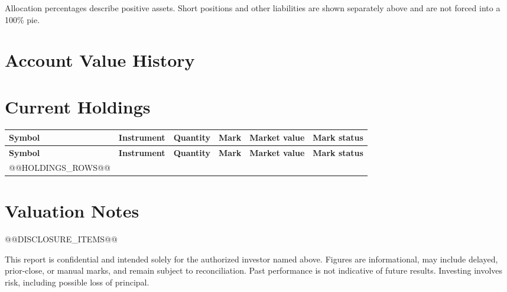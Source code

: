 \documentclass[a4paper,10pt]{article}
\begin{document}
{\footnotesize\color{QSFSlate}
Allocation percentages describe positive assets. Short positions and other liabilities are shown
separately above and are not forced into a 100\% pie.}

\section*{Account Value History}
\begin{center}
\end{center}

\newpage
\section*{Current Holdings}
\small
\begin{longtable}{@{}p{1.7cm}p{3.4cm}r r r p{1.8cm}@{}}
  \toprule
  \textbf{Symbol} & \textbf{Instrument} & \textbf{Quantity} &
  \textbf{Mark} & \textbf{Market value} & \textbf{Mark status} \\
  \midrule
  \endfirsthead
  \toprule
  \textbf{Symbol} & \textbf{Instrument} & \textbf{Quantity} &
  \textbf{Mark} & \textbf{Market value} & \textbf{Mark status} \\
  \midrule
  \endhead
@@HOLDINGS_ROWS@@
  \bottomrule
\end{longtable}

\normalsize
\section*{Valuation Notes}
\begin{itemize}
@@DISCLOSURE_ITEMS@@
\end{itemize}

\vfill
{\footnotesize\color{QSFSlate}
This report is confidential and intended solely for the authorized investor named above.
Figures are informational, may include delayed, prior-close, or manual marks, and remain subject
to reconciliation. Past performance is not indicative of future results. Investing involves risk,
including possible loss of principal.}
\end{document}
